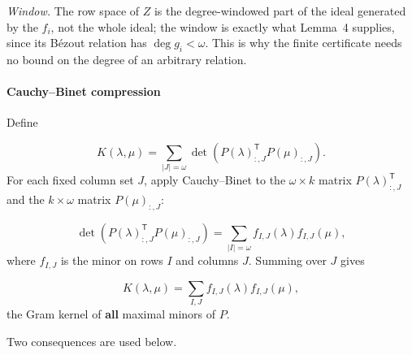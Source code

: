 \documentclass[journal]{IEEEtran}
\theoremstyle{plainn}
\begin{document}
\emph{Window.} The row space of $Z$ is the degree-windowed part of the ideal generated by the
$f_i$, not the whole ideal; the window is exactly what Lemma~4 supplies, since its B\'ezout
relation has $\deg g_i<\omega$. This is why the finite certificate needs no bound on the degree
of an arbitrary relation.

\paragraph*{Cauchy--Binet compression}\label{sec:cb}
Define

\begin{equation}
K(\lambda,\mu)=\sum_{|J|=\omega}
\det\left(P(\lambda)_{:,J}^{\mathsf T}P(\mu)_{:,J}\right).
\end{equation}
For each fixed column set $J$, apply Cauchy--Binet to the $\omega\times k$ matrix $P(\lambda)_{:,J}^{\mathsf T}$ and the $k\times\omega$ matrix $P(\mu)_{:,J}$:

\begin{equation}
\det\!\left(P(\lambda)_{:,J}^{\mathsf T}P(\mu)_{:,J}\right)
=\sum_{|I|=\omega}f_{I,J}(\lambda)f_{I,J}(\mu),
\end{equation}
where $f_{I,J}$ is the minor on rows $I$ and columns $J$. Summing over $J$ gives

\begin{equation}
K(\lambda,\mu)=\sum_{I,J}f_{I,J}(\lambda)f_{I,J}(\mu),
\end{equation}
the Gram kernel of \textbf{all} maximal minors of $P$.

Two consequences are used below.
\end{document}
